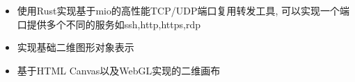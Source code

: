\documentclass{resume}
\begin{document}
\begin{onehalfspacing}
\begin{itemize}
  \item 使用Rust实现基于mio的高性能TCP/UDP端口复用转发工具, 可以实现一个端口提供多个不同的服务如ssh,http,https,rdp
\end{itemize}
\end{onehalfspacing}

\begin{onehalfspacing}
\begin{itemize}
  \item 实现基础二维图形对象表示
  \item 基于HTML Canvas以及WebGL实现的二维画布
\end{itemize}
\end{onehalfspacing}



\end{document}
